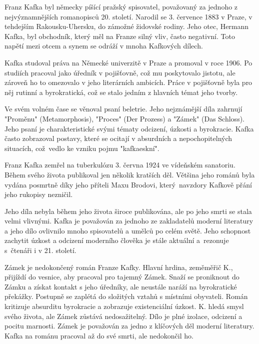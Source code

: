 \documentclass{article}
\begin{document}
	Franz Kafka byl německy píšící pražský spisovatel, považovaný za jednoho z nejvýznamnějších romanopisců 20. století. Narodil se 3. července 1883 v Praze, v tehdejším Rakousku-Uhersku, do zámožné židovské rodiny. Jeho otec, Hermann Kafka, byl obchodník, který měl na Franze silný vliv, často negativní. Toto napětí mezi otcem a synem se odráží v mnoha Kafkových dílech.
	
	Kafka studoval práva na Německé univerzitě v Praze a promoval v roce 1906. Po studiích pracoval jako úředník v pojišťovně, což mu poskytovalo jistotu, ale zároveň ho to omezovalo v jeho literárních ambicích. Práce v pojišťovně byla pro něj rutinní a byrokratická, což se stalo jedním z hlavních témat jeho tvorby.
	
	Ve svém volném čase se věnoval psaní beletrie. Jeho nejznámější díla zahrnují "Proměnu" (Metamorphosis), "Proces" (Der Prozess) a "Zámek" (Das Schloss). Jeho psaní je charakteristické svými tématy odcizení, úzkosti a byrokracie. Kafka často zobrazoval postavy, které se ocitají v absurdních a nepochopitelných situacích, což~vedlo ke vzniku pojmu "kafkaeskní".
	
	Franz Kafka zemřel na tuberkulózu 3. června 1924 ve vídeňském sanatoriu. Během svého života publikoval jen několik kratších děl. Většina jeho románů byla vydána posmrtně díky jeho příteli Maxu Brodovi, který~navzdory Kafkově přání jeho rukopisy nezničil.
	
	Jeho díla nebyla během jeho života široce publikována, ale po jeho smrti se stala velmi vlivnými. Kafka je považován za jednoho ze zakladatelů moderní literatury a jeho dílo ovlivnilo mnoho spisovatelů a umělců po celém světě. Jeho schopnost zachytit úzkost a odcizení moderního člověka je stále aktuální a~rezonuje s~čtenáři i v 21. století.
	
	\vspace{3em}
	
	Zámek je nedokončený román Franze Kafky.
	Hlavní hrdina, zeměměřič K., přijíždí do vesnice, aby pracoval pro tajemný Zámek.
	Snaží se proniknout do Zámku a získat kontakt s jeho úředníky, ale neustále naráží na byrokratické překážky.
	Postupně se zaplétá do složitých vztahů s místními obyvateli. Román kritizuje absurditu byrokracie a zobrazuje existenciální úzkost.
	K. hledá smysl svého života, ale Zámek zůstává nedosažitelný.
	Dílo je plné izolace, odcizení a pocitu marnosti.
	Zámek je považován za jedno z klíčových děl moderní literatury.
	Kafka na románu pracoval až do své smrti, ale nedokončil ho.
\end{document}
